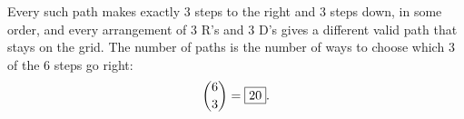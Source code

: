 Every such path makes exactly $3$ steps to the right and $3$ steps down, in some order, and every arrangement of $3$ R's and $3$ D's gives a different valid path that stays on the grid. The number of paths is the number of ways to choose which $3$ of the $6$ steps go right:
\[
\dbinom63=\boxed{20}.
\]
